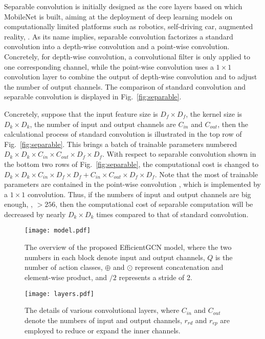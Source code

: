 \documentclass[10pt,journal,compsoc]{IEEEtran}
\begin{document}
Separable convolution is initially designed as the core layers based on which MobileNet \cite{howard2017mobilenets} is built, aiming at the deployment of deep learning models on computationally limited platforms such as robotics, self-driving car, augmented reality, \etc. As its name implies, separable convolution factorizes a standard convolution into a depth-wise convolution and a point-wise convolution. Concretely, for depth-wise convolution, a convolutional filter is only applied to one corresponding channel, while the point-wise convolution uses a $1\times1$ convolution layer to combine the output of depth-wise convolution and to adjust the number of output channels. The comparison of standard convolution and separable convolution is displayed in Fig.~\ref{fig:separable}.

Concretely, suppose that the input feature size is $D_f\times D_f$, the kernel size is $D_k\times D_k$, the number of input and output channels are $C_{in}$ and $C_{out}$, then the calculational process of standard convolution is illustrated in the top row of Fig.~\ref{fig:separable}. This brings a batch of trainable parameters numbered $D_k\times D_k\times C_{in}\times C_{out}\times D_f\times D_f$. With respect to separable convolution shown in the bottom two rows of Fig.~\ref{fig:separable}, the computational cost is changed to $D_k\times D_k\times C_{in}\times D_f\times D_f + C_{in}\times C_{out}\times D_f\times D_f$. Note that the most of trainable parameters are contained in the point-wise convolution \cite{howard2017mobilenets}, which is implemented by a $1\times1$ convolution. Thus, if the numbers of input and output channels are big enough, \eg, $>256$, then the computational cost of separable computation will be decreased by nearly $D_k\times D_k$ times compared to that of standard convolution.

\begin{figure}[t]
  \vspace{-0.2cm}
  \centerline{\texttt{[image: model.pdf]}}
  \vspace{-0.4cm}
  \caption{The overview of the proposed EfficientGCN model, where the two numbers in each block denote input and output channels, $Q$ is the number of action classes, $\oplus$ and $\odot$ represent concatenation and element-wise product, and $/2$ represents a stride of 2. \bv}\label{fig:model}
  \vspace{-0.4cm}
\end{figure}

\begin{figure*}[t]
  \centerline{\texttt{[image: layers.pdf]}}
  \vspace{-0.4cm}
  \caption{The details of various convolutional layers, where $C_{in}$ and $C_{out}$ denote the numbers of input and output channels, $r_{rd}$ and $r_{ep}$ are employed to reduce or expand the inner channels. \bv}\label{fig:layers}
  \vspace{-0.4cm}
\end{figure*}
\end{document}
